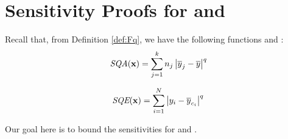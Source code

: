 \section{Sensitivity Proofs for \sqa and \sqe}\label{sec:fqsensitivity}

Recall that, from Definition \ref{def:Fq}, we have the following functions \sqa and \sqe:
\begin{equation*}
\textit{SQA}(\mathbf{x}) = \sum_{j=1}^k n_j \left\vert \overline{y}_j - \overline{y} \right\vert^q
\end{equation*}

\begin{equation*}
\textit{SQE}(\mathbf{x}) = \sum_{i=1}^N \left\vert y_i - \overline{y}_{c_i} \right\vert^q
\end{equation*}

\noindent Our goal here is to bound the sensitivities for \sqa and \sqe.

